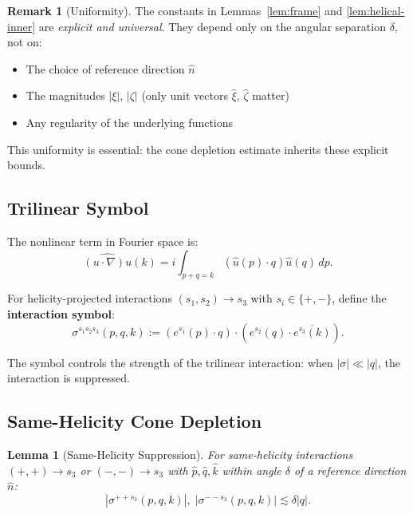 \documentclass[11pt]{article}
\newtheorem{lemma}[theorem]{Lemma}
\theoremstyle{definition}
\newtheorem{remark}[theorem]{Remark}
\begin{document}
\begin{remark}[Uniformity]
The constants in Lemmas~\ref{lem:frame} and \ref{lem:helical-inner} are \emph{explicit and universal}. They depend only on the angular separation $\delta$, not on:
\begin{itemize}
\item The choice of reference direction $\hat{n}$
\item The magnitudes $|\xi|$, $|\zeta|$ (only unit vectors $\hat{\xi}$, $\hat{\zeta}$ matter)
\item Any regularity of the underlying functions
\end{itemize}
This uniformity is essential: the cone depletion estimate inherits these explicit bounds.
\end{remark}

\subsection{Trilinear Symbol}

The nonlinear term in Fourier space is:
\begin{equation}
\widehat{(u \cdot \nabla)u}(k) = i \int_{p+q=k} (\hat{u}(p) \cdot q) \hat{u}(q) \, dp.
\end{equation}

For helicity-projected interactions $(s_1, s_2) \to s_3$ with $s_i \in \{+, -\}$, define the \textbf{interaction symbol}:
\begin{equation}
\sigma^{s_1 s_2 s_3}(p,q,k) := (e^{s_1}(p) \cdot q) \cdot (e^{s_2}(q) \cdot \overline{e^{s_3}(k)}).
\end{equation}

The symbol controls the strength of the trilinear interaction: when $|\sigma| \ll |q|$, the interaction is suppressed.

\subsection{Same-Helicity Cone Depletion}

\begin{lemma}[Same-Helicity Suppression]\label{lem:cone}
For same-helicity interactions $(+,+) \to s_3$ or $(-,-) \to s_3$ with $\hat{p}, \hat{q}, \hat{k}$ within angle $\delta$ of a reference direction $\hat{n}$:
\begin{equation}
|\sigma^{++s_3}(p,q,k)|, \; |\sigma^{--s_3}(p,q,k)| \lesssim \delta |q|.
\end{equation}
\end{lemma}
\end{document}
